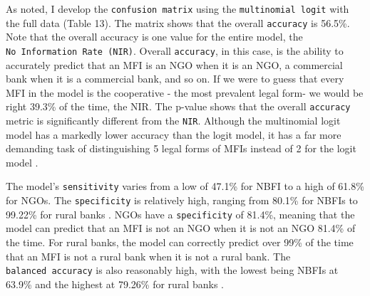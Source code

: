 \documentclass[a4paper, nobind]{templates/ociamthesis}
\begin{document}
As noted, I develop the \texttt{confusion\ matrix} using the \texttt{multinomial\ logit} with the full data (Table 13). The matrix shows that the overall \texttt{accuracy} is 56.5\%. Note that the overall accuracy is one value for the entire model, the \texttt{No\ Information\ Rate\ (NIR)}. Overall \texttt{accuracy}, in this case, is the ability to accurately predict that an MFI is an NGO when it is an NGO, a commercial bank when it is a commercial bank, and so on. If we were to guess that every MFI in the model is the cooperative - the most prevalent legal form- we would be right 39.3\% of the time, the NIR. The p-value shows that the overall \texttt{accuracy} metric is significantly different from the \texttt{NIR}. Although the multinomial logit model has a markedly lower accuracy than the logit model, it has a far more demanding task of distinguishing 5 legal forms of MFIs instead of 2 for the logit model \autocite{kwak2002multinomial}.

The model's \texttt{sensitivity} varies from a low of 47.1\% for NBFI to a high of 61.8\% for NGOs. The \texttt{specificity} is relatively high, ranging from 80.1\% for NBFIs to 99.22\% for rural banks \autocite{ginting2019hate}. NGOs have a \texttt{specificity} of 81.4\%, meaning that the model can predict that an MFI is not an NGO when it is not an NGO 81.4\% of the time. For rural banks, the model can correctly predict over 99\% of the time that an MFI is not a rural bank when it is not a rural bank. The \texttt{balanced\ accuracy} is also reasonably high, with the lowest being NBFIs at 63.9\% and the highest at 79.26\% for rural banks \autocite{hedeker2003mixed}.

\newpage
\end{document}
